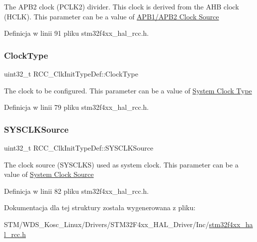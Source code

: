 The A\+P\+B2 clock (P\+C\+L\+K2) divider. This clock is derived from the A\+HB clock (H\+C\+LK). This parameter can be a value of \hyperlink{group___r_c_c___a_p_b1___a_p_b2___clock___source}{A\+P\+B1/\+A\+P\+B2 Clock Source} 

Definicja w linii 91 pliku stm32f4xx\+\_\+hal\+\_\+rcc.\+h.

\mbox{\label{struct_r_c_c___clk_init_type_def_a93a53676a1cfc5b55b8b990e7ff4dac5}} 
\subsubsection{\texorpdfstring{Clock\+Type}{ClockType}}
{\footnotesize\ttfamily uint32\+\_\+t R\+C\+C\+\_\+\+Clk\+Init\+Type\+Def\+::\+Clock\+Type}

The clock to be configured. This parameter can be a value of \hyperlink{group___r_c_c___system___clock___type}{System Clock Type} 

Definicja w linii 79 pliku stm32f4xx\+\_\+hal\+\_\+rcc.\+h.

\mbox{\label{struct_r_c_c___clk_init_type_def_a4ceff1fdbf423e347c63052ca2c1d7e1}} 
\subsubsection{\texorpdfstring{S\+Y\+S\+C\+L\+K\+Source}{SYSCLKSource}}
{\footnotesize\ttfamily uint32\+\_\+t R\+C\+C\+\_\+\+Clk\+Init\+Type\+Def\+::\+S\+Y\+S\+C\+L\+K\+Source}

The clock source (S\+Y\+S\+C\+L\+KS) used as system clock. This parameter can be a value of \hyperlink{group___r_c_c___system___clock___source}{System Clock Source} 

Definicja w linii 82 pliku stm32f4xx\+\_\+hal\+\_\+rcc.\+h.



Dokumentacja dla tej struktury została wygenerowana z pliku\+:\begin{DoxyCompactItemize}
\item 
S\+T\+M/\+W\+D\+S\+\_\+\+Kosc\+\_\+\+Linux/\+Drivers/\+S\+T\+M32\+F4xx\+\_\+\+H\+A\+L\+\_\+\+Driver/\+Inc/\hyperlink{stm32f4xx__hal__rcc_8h}{stm32f4xx\+\_\+hal\+\_\+rcc.\+h}\end{DoxyCompactItemize}
